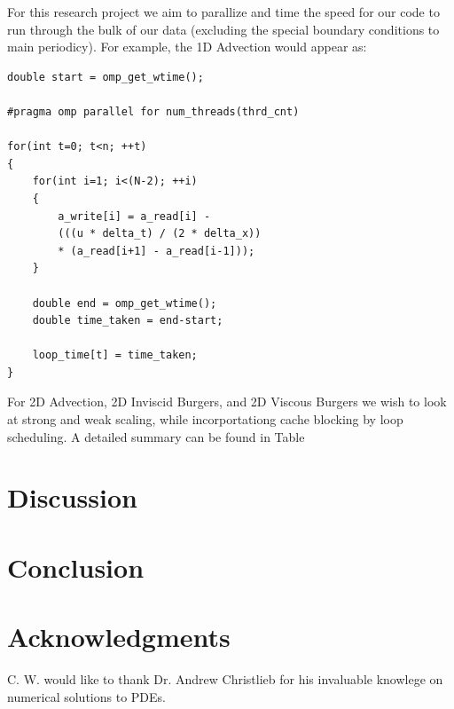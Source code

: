 \documentclass{article}
\begin{document}
For this research project we aim to parallize and time the speed for our code to run through the bulk of our data (excluding the special boundary conditions to main periodicy). For example, the 1D Advection would appear as:

\begin{lstlisting}
double start = omp_get_wtime();

#pragma omp parallel for num_threads(thrd_cnt)

for(int t=0; t<n; ++t)
{
	for(int i=1; i<(N-2); ++i)
   	{
   		a_write[i] = a_read[i] - 
   		(((u * delta_t) / (2 * delta_x)) 
   		* (a_read[i+1] - a_read[i-1]));
  	}

	double end = omp_get_wtime();
	double time_taken = end-start;
	
	loop_time[t] = time_taken;
}	
\end{lstlisting}



For 2D Advection, 2D Inviscid Burgers, and 2D Viscous Burgers we wish to look at strong and weak scaling, while incorportationg cache blocking by loop scheduling. A detailed summary can be found in Table 




\section{Discussion}
\section{Conclusion}
\section{Acknowledgments}

C. W. would like to thank Dr. Andrew Christlieb for his invaluable knowlege on numerical solutions to PDEs.







  

\end{document}
